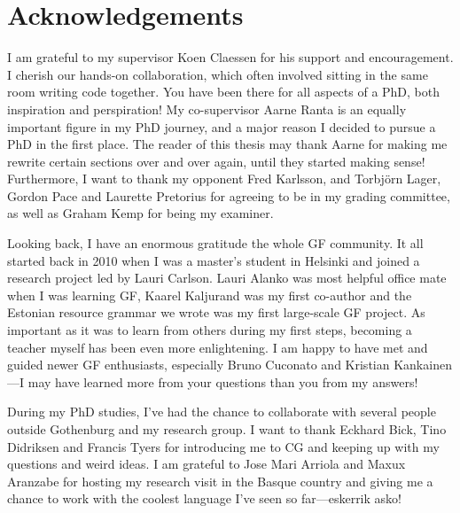 \chapter*{Acknowledgements}\label{chp:acknowledgements}






I am grateful to my supervisor Koen Claessen for his support and encouragement.
I cherish our hands-on collaboration, which often involved sitting in the same
room writing code together. You have been there for all aspects of a PhD,
both inspiration and perspiration!
My co-supervisor Aarne Ranta is an equally important figure in my PhD
journey, and a major reason I decided to pursue a PhD in the first
place. The reader of this thesis may thank Aarne for making me rewrite
certain sections over and over again, until they started making sense!
%
Furthermore, I want to thank my opponent Fred Karlsson, and Torbjörn
Lager, Gordon Pace and Laurette Pretorius for agreeing to be in my
grading committee, as well as Graham Kemp for being my examiner.

Looking back, I have an enormous gratitude the whole GF community.
It all started back in 2010 when I was a master's student in Helsinki
and joined a research project led by Lauri Carlson. Lauri Alanko was
most helpful office mate when I was learning GF, Kaarel Kaljurand was
my first co-author and the Estonian resource grammar we wrote was my
first large-scale GF project.  As important as it was to learn from
others during my first steps, becoming a teacher myself has been even
more enlightening. I am happy to have met and guided newer GF
enthusiasts, especially Bruno Cuconato and Kristian Kankainen---I may
have learned more from your questions than you from my answers!

During my PhD studies, I've had the chance to collaborate with several
people outside Gothenburg and my research group. I want to thank
Eckhard Bick, Tino Didriksen and Francis Tyers for introducing me to
CG and keeping up with my questions and weird ideas.  I am grateful to
Jose Mari Arriola and Maxux Aranzabe for hosting my research visit in
the Basque country and giving me a chance to work with the coolest
language I've seen so far---eskerrik asko!

